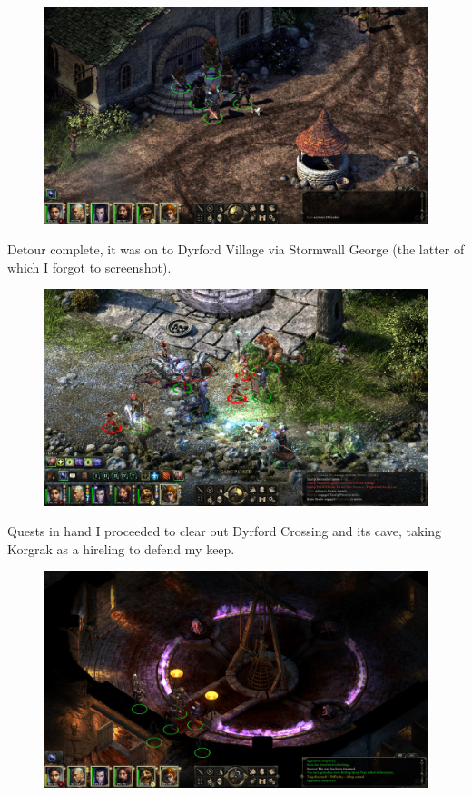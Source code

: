 \documentclass{article}
\begin{document}
\begin{figure}
\includegraphics[scale=0.33]{files/blog/2018_11_25_pillars_of_eternity_path_of_the_damned_act_ii/2018_11_25_dyrfordvillage.jpg}
\end{figure}

Detour complete, it was on to Dyrford Village via Stormwall George (the latter of which I forgot to screenshot).

\begin{figure}
\includegraphics[scale=0.33]{files/blog/2018_11_25_pillars_of_eternity_path_of_the_damned_act_ii/2018_11_25_dyrfordcrossing.jpg}
\end{figure}

Quests in hand I proceeded to clear out Dyrford Crossing and its cave, taking Korgrak as a hireling to defend my keep.

\begin{figure}
\includegraphics[scale=0.33]{files/blog/2018_11_25_pillars_of_eternity_path_of_the_damned_act_ii/2018_11_25_dyrfordruins.jpg}
\end{figure}
\end{document}
